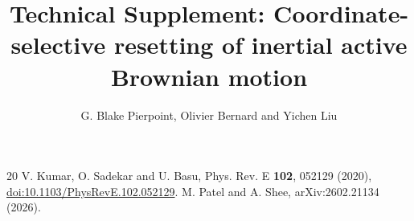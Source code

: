 \documentclass[11pt]{article}
\begin{document}
\title{Technical Supplement: Coordinate-selective resetting of inertial active Brownian motion}
\author{G. Blake Pierpoint, Olivier Bernard and Yichen Liu}
\date{}
\maketitle
\setcounter{section}{-1}
\renewcommand{\thesection}{S\arabic{section}}
\renewcommand{\thesubsection}{S\arabic{section}.\arabic{subsection}}
\renewcommand{\thetable}{S\arabic{table}}

\begin{thebibliography}{20}
 V. Kumar, O. Sadekar and U. Basu, Phys. Rev. E \textbf{102}, 052129 (2020), \href{https://doi.org/10.1103/PhysRevE.102.052129}{doi:10.1103/PhysRevE.102.052129}.
\setcounter{enumiv}{19}
 M. Patel and A. Shee, arXiv:2602.21134 (2026).
\end{thebibliography}
\end{document}
